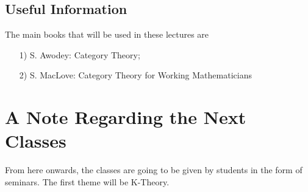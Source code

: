 \documentclass{article}
\begin{document}
\subsection{Useful Information}

The main books that will be used in these lectures are
\begin{itemize}
	\item[1)]S. Awodey: Category Theory;
	\item[2)]S. MacLove: Category Theory for Working Mathematicians
\end{itemize}

\newpage


\newpage

\newpage

\newpage

\newpage

\newpage

\newpage

\newpage

\newpage

\newpage

\newpage

\newpage

\newpage

\newpage

\newpage

\newpage

\newpage

\newpage

\newpage

\newpage

\newpage

\newpage

\newpage

\newpage
\section*{A Note Regarding the Next Classes}

From here onwards, the classes are going to be given by students in the form of seminars. The first theme will be K-Theory.
\newpage

\newpage
\end{document}
